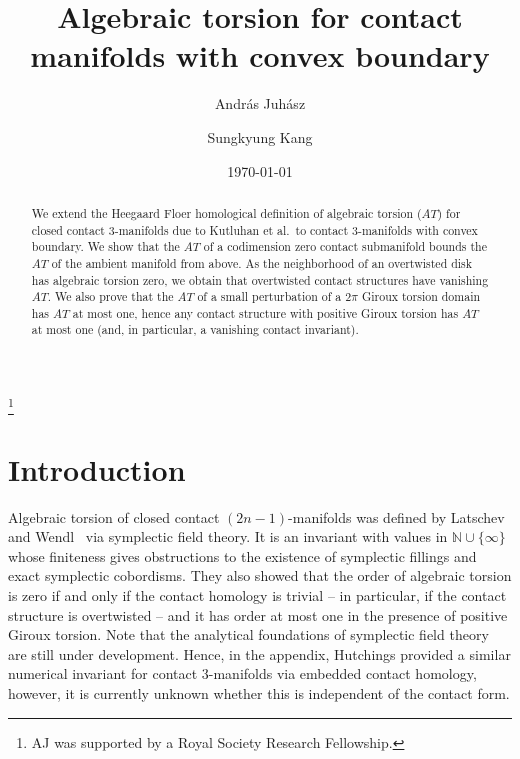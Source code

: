 \documentclass[11pt,oneside,english]{amsart}
\numberwithin{equation}{section}
\numberwithin{figure}{section}
\theoremstyle{definition}
\theoremstyle{plain}
\theoremstyle{plain}
\theoremstyle{remark}
\theoremstyle{plain}
\begin{document}
\title{Algebraic torsion for contact manifolds with convex boundary}
\author{Andr\'as Juh\'asz}\address{Mathematical Institute, University of Oxford, Andrew Wiles Building,
Radcliffe Observatory Quarter, Woodstock Road, Oxford, OX2 6GG, UK}\thanks{AJ was supported by a Royal Society Research Fellowship.}

\author{Sungkyung Kang}\address{Mathematical Institute, University of Oxford, Andrew Wiles Building,
Radcliffe Observatory Quarter, Woodstock Road, Oxford, OX2 6GG, UK}

\date{\today}
\begin{abstract}
We extend the Heegaard Floer homological definition of algebraic torsion (${\mathit{AT}}$) for closed contact 3-manifolds
due to Kutluhan et al.~to contact 3-manifolds with
convex boundary. We show that the ${\mathit{AT}}$ of a codimension zero contact submanifold
bounds the ${\mathit{AT}}$ of the ambient manifold from above.
As the neighborhood of an overtwisted disk has algebraic torsion zero, we obtain
that overtwisted contact structures have vanishing ${\mathit{AT}}$.
We also prove that the ${\mathit{AT}}$ of a small perturbation of a
$2\pi$ Giroux torsion domain has ${\mathit{AT}}$ at most one,
hence any contact structure with positive Giroux torsion has ${\mathit{AT}}$ at most one
(and, in particular, a vanishing contact invariant).
\end{abstract}

\maketitle

\section{Introduction}

Algebraic torsion of closed contact $(2n-1)$-manifolds was defined by
Latschev and Wendl~\cite{key-11} via symplectic field theory.
It is an invariant with values in ${\mathbb{N}} \cup \{\infty\}$ whose finiteness
gives obstructions to the existence of symplectic fillings and exact symplectic cobordisms.
They also showed that the order of algebraic torsion is zero if and only if the
contact homology is trivial -- in particular, if the contact structure is overtwisted --
and it has order at most one in the presence of positive Giroux torsion.
Note that the analytical foundations of symplectic field theory are still under
development. Hence, in the appendix, Hutchings provided a similar numerical invariant
for contact 3-manifolds via embedded contact homology, however, it is currently unknown
whether this is independent of the contact form.
\end{document}
